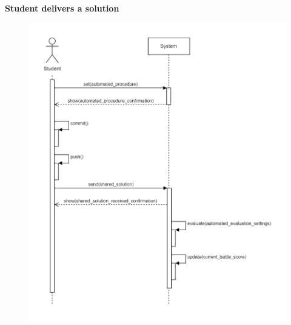 \documentclass[../RASD.tex]{subfiles}
\begin{document}
    \textbf{Student delivers a solution}
    \begin{figure}[h!]
        \centering
        \hspace*{2cm}
        \includegraphics[width=1\textwidth]{../assets/section_3/GroupStudentDeliversASolution.png}
        \hspace*{-2cm}
    \end{figure}
    \newpage
\end{document}
